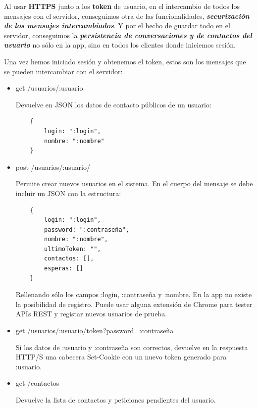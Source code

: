\documentclass[]{article}
\begin{document}
\hfill

Al usar \textbf{HTTPS} junto a los \textbf{token} de usuario, en el intercambio de todos los mensajes con el servidor, conseguimos otra de las funcionalidades, \textbf{\textit{securización de los mensajes intercambiados}}. Y por el hecho de guardar todo en el servidor, conseguimos la \textbf{\textit{persistencia de conversaciones y de contactos del usuario}} no sólo en la app, sino en todos los clientes donde iniciemos sesión.

\hfill

Una vez hemos iniciado sesión y obtenemos el token, estos son los mensajes que se pueden intercambiar con el servidor:

\begin{itemize}
	\item get /usuarios/:usuario
	
	Devuelve en JSON los datos de contacto públicos de un usuario:
	
	\begin{BVerbatim}
	{
		login: ":login",
		nombre: ":nombre"
	}
	\end{BVerbatim}

	
	\item post /usuarios/:usuario/
	
	Permite crear nuevos usuarios en el sistema. En el cuerpo del mensaje se debe incluir un JSON con la estructura:
	
	\begin{BVerbatim}
	{
		login: ":login",
		password: ":contraseña",
		nombre: ":nombre",
		ultimoToken: "",
		contactos: [],
		esperas: []
	}
	\end{BVerbatim}
	
	Rellenando sólo los campos :login, :contraseña y :nombre. En la app no existe la posibilidad de registro. Puede usar alguna extensión de Chrome para tester APIs REST y registar nuevos usuarios de prueba.
	
	
	
	\item get /usuarios/:usuario/token?password=:contraseña
	
	Si los datos de :usuario y :contraseña son correctos, devuelve en la respuesta HTTP/S una cabecera Set-Cookie con un nuevo token generado para :usuario.
	
	
	\item get /contactos
	
	Devuelve la lista de contactos y peticiones pendientes del usuario.
	

\end{itemize}
\end{document}
